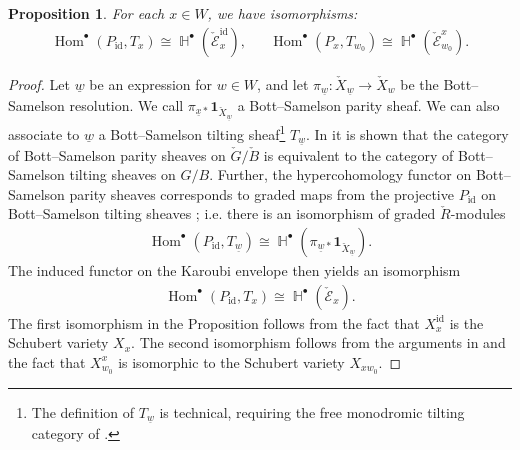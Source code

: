 \documentclass[11pt]{article}
\DeclareMathOperator{\bH}{\mathbb{H}}
\DeclareMathOperator{\Hom}{Hom}
\DeclareMathOperator{\id}{id}
\newtheorem{prop}[thm]{Proposition}
\theoremstyle{remark}
\theoremstyle{definition}
\begin{document}
     \begin{prop}
\label{Prop: Categorify numerics}
        For each $x \in W$, we have isomorphisms:
        \begin{align*}
            \Hom^{\bullet}(P_{\id} , T_x) \cong \bH^{\bullet}(\check{\mathscr{E}}_x^{\id}),
            &&
            \Hom^{\bullet}(P_{x} , T_{w_0}) \cong \bH^{\bullet}(\check{\mathscr{E}}_{w_0}^{x}).
        \end{align*}
    \end{prop}

    \begin{proof}
        Let $\underline{w}$ be an expression for $w \in W$, and let  $\pi_{\underline{w}} : \check{X}_{\underline{w}} \rightarrow \check{X}_w$ be the Bott--Samelson resolution. 
        We call $\pi_{\underline{x}*}\mathbf{1}_{\check{X}_{\underline{w}}}$ a Bott--Samelson parity sheaf.
        We can also associate to $\underline{w}$ a Bott--Samelson tilting sheaf\footnote{The definition of $T_{\underline{w}}$ is technical, requiring the free monodromic tilting category of \cite{AMRW19}.} $T_{\underline{w}}$. 
        In \cite[\S 5.1]{AMRW19} it is shown that the category of Bott--Samelson parity sheaves on $\check{G}/\check{B}$ is equivalent to the category of Bott--Samelson tilting sheaves on $G/B$. 
        Further, the hypercohomology functor on Bott--Samelson parity sheaves corresponds to graded maps from the projective $P_{\id}$ on Bott--Samelson tilting sheaves \cite[\S3.6]{AMRW19}; i.e. there is an isomorphism of graded $\check{R}$-modules
        \begin{align*}
            \Hom^{\bullet} (P_{\id}, T_{\underline{w}})
            \cong
             \bH^{\bullet}(\pi_{\underline{w} *}\mathbf{1}_{\check{X}_{\underline{w}}}).
        \end{align*}
        The induced functor on the Karoubi envelope then yields an isomorphism
        \begin{align*}
            \Hom^{\bullet} (P_{\id}, T_x)
            \cong 
            \bH^{\bullet}(\check{\mathscr{E}}_x).
        \end{align*}
        The first isomorphism in the Proposition follows from the fact that $X_x^{\id}$ is the Schubert variety $X_x$. 
        The second isomorphism follows from the arguments in \cite[\S5]{Bai} and the fact that $X_{w_0}^x$ is isomorphic to the Schubert variety $X_{xw_0}$.
    \end{proof}
\end{document}
